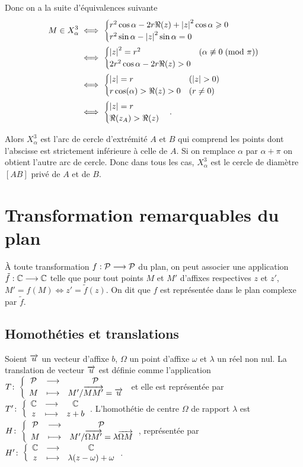 Donc on a la suite d'équivalences suivante
\begin{align}
  M \in X_{\alpha}^3
  & \iff
  \begin{cases}
    r^2\cos \alpha - 2r\Re(z) + \left\lvert z\right\rvert^2\cos \alpha \geqslant 0 \\
    r^2\sin \alpha - \left\lvert z\right\rvert^2\sin \alpha = 0
  \end{cases}\\
  & \iff
  \begin{cases}
    \left\lvert z\right\rvert^2 = r^2 & (\alpha \not\equiv 0\!\pmod {\pi}) \\
    2r^2\cos \alpha - 2r \Re(z)>0&
  \end{cases}\\
  & \iff
  \begin{cases}
    \left\lvert z\right\rvert = r & (\left\lvert z\right\rvert>0)\\ r\cos(\alpha) > \Re(z)>0 &
    (r\neq 0)
  \end{cases}\\
  & \iff
  \begin{cases}
    \left\lvert z\right\rvert = r \\ \Re(z_A) > \Re(z)
  \end{cases}.
\end{align}

Alors \(X_{\alpha}^{3}\) est l'arc de cercle d'extrémité \(A\) et \(B\) qui
comprend les points dont l'abscisse est strictement inférieure à celle de
\(A\).  Si on remplace \(\alpha\) par \(\alpha + \pi\) on obtient l'autre
arc de cercle.  Donc dans tous les cas, \(X_{\alpha}^3\) est le cercle de
diamètre \([AB]\) privé de \(A\) et de \(B\).

\section{Transformation remarquables du plan}

À toute transformation \(f:\mathcal{P} \longrightarrow{} \mathcal{P}\) du plan, on peut associer une
application \(\tilde{f}:\mathbb{C} \longrightarrow{} \mathbb{C}\) telle que pour tout points \(M\)
et \(M'\) d'affixes respectives \(z\) et \(z'\), \(M' = f(M) \iff z' =
\tilde{f}(z)\). On dit que \(f\) est représentée dans le plan complexe par
\(\tilde{f}\).

\subsection{Homothéties et translations}

\begin{defdef}
  Soient \(\overrightarrow{u}\) un vecteur d'affixe \(b\), \(\Omega\) un point d'affixe
  \(\omega\) et \(\lambda\) un réel non nul. La translation de vecteur
  \(\overrightarrow{u}\) est définie comme l'application \(T\colon\left\{\begin{array}{ccc}\mathcal{P} & \longrightarrow &\mathcal{P}\\M & \longmapsto & M' /
  \overrightarrow{MM'} = \overrightarrow{u}\end{array}\right.\) et elle est représentée par
  \(T'\colon\left\{\begin{array}{ccc}\mathbb{C} & \longrightarrow &\mathbb{C}\\z & \longmapsto & z + b\end{array}\right.\).  L'homothétie de centre \(\Omega\) de
  rapport \(\lambda\) est \(H\colon\left\{\begin{array}{ccc}\mathcal{P} & \longrightarrow &\mathcal{P}\\M & \longmapsto & M' / \overrightarrow{\Omega M'} =
  \lambda \overrightarrow{\Omega M}\end{array}\right.\), représentée par
  \(H'\colon\left\{\begin{array}{ccc}\mathbb{C} & \longrightarrow &\mathbb{C}\\z & \longmapsto & \lambda(z - \omega) + \omega\end{array}\right.\).
\end{defdef}

